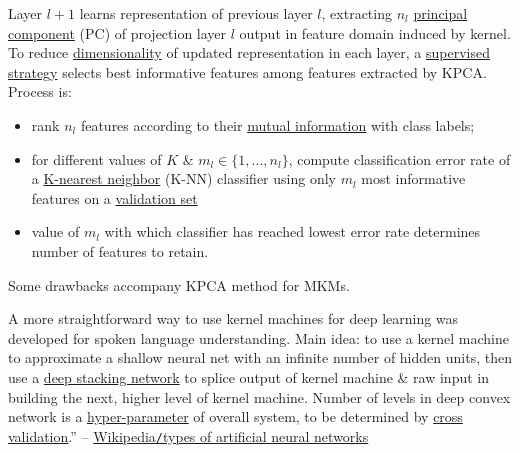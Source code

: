 \documentclass{article}
\begin{document}
\begin{itemize}
	Layer $l + 1$ learns representation of previous layer $l$, extracting $n_l$ \href{https://en.wikipedia.org/wiki/Principal_component_analysis}{principal component} (PC) of projection layer $l$ output in feature domain induced by kernel. To reduce \href{https://en.wikipedia.org/wiki/Dimensionality_reduction}{dimensionality} of updated representation in each layer, a \href{https://en.wikipedia.org/wiki/Supervised_learning}{supervised strategy} selects best informative features among features extracted by KPCA. Process is:
	\begin{itemize}
		\item rank $n_l$ features according to their \href{https://en.wikipedia.org/wiki/Mutual_information}{mutual information} with class labels;
		\item for different values of $K$ \& $m_l\in\{1,\ldots,n_l\}$, compute classification error rate of a \href{https://en.wikipedia.org/wiki/K-nearest_neighbor}{K-nearest neighbor} (K-NN) classifier using only $m_l$ most informative features on a \href{https://en.wikipedia.org/wiki/Validation_set}{validation set}
		\item value of $m_l$ with which classifier has reached lowest error rate determines number of features to retain.
	\end{itemize}
	Some drawbacks accompany KPCA method for MKMs. 
	
	A more straightforward way to use kernel machines for deep learning was developed for spoken language understanding. Main idea: to use a kernel machine to approximate a shallow neural net with an infinite number of hidden units, then use a \href{https://en.wikipedia.org/wiki/Deep_stacking_network}{deep stacking network} to splice output of kernel machine \& raw input in building the next, higher level of kernel machine. Number of levels in deep convex network is a \href{https://en.wikipedia.org/wiki/Hyperparameter_(machine_learning)}{hyper-parameter} of overall system, to be determined by \href{https://en.wikipedia.org/wiki/Cross-validation_(statistics)}{cross validation}.'' -- \href{https://en.wikipedia.org/wiki/Types_of_artificial_neural_networks}{Wikipedia{\tt/}types of artificial neural networks}
\end{itemize}


\printbibliography[heading=bibintoc]
	
\end{document}
